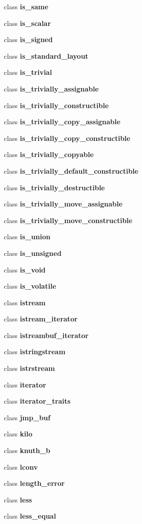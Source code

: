 \begin{DoxyCompactItemize}
\item 
class {\bf is\+\_\+same}
\item 
class {\bf is\+\_\+scalar}
\item 
class {\bf is\+\_\+signed}
\item 
class {\bf is\+\_\+standard\+\_\+layout}
\item 
class {\bf is\+\_\+trivial}
\item 
class {\bf is\+\_\+trivially\+\_\+assignable}
\item 
class {\bf is\+\_\+trivially\+\_\+constructible}
\item 
class {\bf is\+\_\+trivially\+\_\+copy\+\_\+assignable}
\item 
class {\bf is\+\_\+trivially\+\_\+copy\+\_\+constructible}
\item 
class {\bf is\+\_\+trivially\+\_\+copyable}
\item 
class {\bf is\+\_\+trivially\+\_\+default\+\_\+constructible}
\item 
class {\bf is\+\_\+trivially\+\_\+destructible}
\item 
class {\bf is\+\_\+trivially\+\_\+move\+\_\+assignable}
\item 
class {\bf is\+\_\+trivially\+\_\+move\+\_\+constructible}
\item 
class {\bf is\+\_\+union}
\item 
class {\bf is\+\_\+unsigned}
\item 
class {\bf is\+\_\+void}
\item 
class {\bf is\+\_\+volatile}
\item 
class {\bf istream}
\item 
class {\bf istream\+\_\+iterator}
\item 
class {\bf istreambuf\+\_\+iterator}
\item 
class {\bf istringstream}
\item 
class {\bf istrstream}
\item 
class {\bf iterator}
\item 
class {\bf iterator\+\_\+traits}
\item 
class {\bf jmp\+\_\+buf}
\item 
class {\bf kilo}
\item 
class {\bf knuth\+\_\+b}
\item 
class {\bf lconv}
\item 
class {\bf length\+\_\+error}
\item 
class {\bf less}
\item 
class {\bf less\+\_\+equal}
\item 

\end{DoxyCompactItemize}
